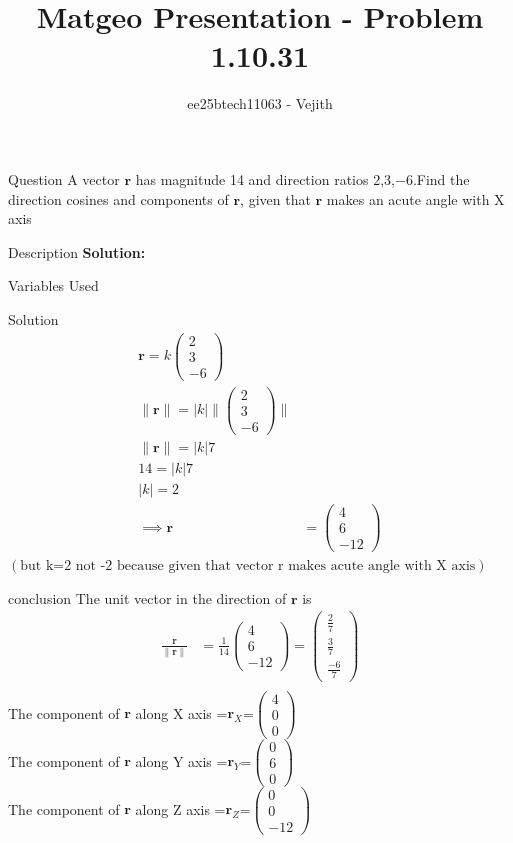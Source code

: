 \documentclass{beamer}
\title{Matgeo Presentation - Problem 1.10.31}
\author{ee25btech11063 - Vejith}
\numberwithin{equation}{section}
\providecommand{\brak}[1]{\ensuremath{\left(#1\right)}}
\theoremstyle{remark}
\providecommand{\abs}[1]{\left\vert#1\right\vert}
\providecommand{\norm}[1]{\lVert#1\rVert}
\newcommand{\myvec}[1]{\ensuremath{\begin{pmatrix}#1\end{pmatrix}}}
\let\vec\mathbf
\begin{document}
\frame{\titlepage}
\begin{frame}{Question}
A vector $\vec{r}$ has magnitude 14 and direction ratios $2$,$3$,$-6$.Find the direction cosines and components of $\vec{r}$, given that $\vec{r}$ makes an acute angle with X axis
\end{frame}

\begin{frame}{Description}
\textbf{Solution: }\\
\begin{table}[h!]    
  \centering
  
  \caption{Variables Used}
  \label{}
\end{table}
\end{frame}

\begin{frame}{Solution}
\begin{align}
     \vec{r}=k\myvec{2\\3\\-6}\\
     \norm{\vec{r}}=\abs{k}\norm{\myvec{2\\3\\-6}}\\
     \norm{\vec{r}}=\abs{k}7\\
     14=\abs{k}7\\
     \abs{k}=2\\
     \implies \vec{r}&=\myvec{4\\6\\-12} 
\end{align}
\brak{\text{but k=2 not -2 because given that vector r makes acute angle with X axis}}
\end{frame}
\begin{frame}{conclusion}
 The unit vector in the direction of $\vec{r}$ is
\begin{align}
    \frac{\vec{r}}{\norm{\vec{r}}} &= \frac{1}{14}\myvec{4\\6\\-12} = \myvec{\frac{2}{7}\\\frac{3}{7}\\\frac{-6}{7}}\\
    \end{align}
The component of $\vec{r}$ along X axis =$\vec{r}_X$=\myvec{4\\0\\0}\\
The component of $\vec{r}$ along Y axis =$\vec{r}_Y$=\myvec{0\\6\\0}\\
The component of $\vec{r}$ along Z axis =$\vec{r}_Z$=\myvec{0\\0\\-12}\\
\end{frame}
\end{document}

